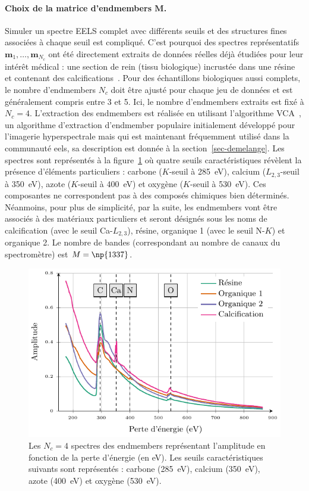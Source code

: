 \paragraph{Choix de la matrice d'endmembers $\mathbf{M}$.} Simuler un spectre EELS complet avec différents seuils et des structures fines associées à chaque seuil est compliqué. C'est pourquoi des spectres représentatifs $\mathbf{m}_1,\dots,\mathbf{m}_{N_c}$ ont été directement extraits de données réelles déjà étudiées pour leur intérêt médical : une section de rein (tissu biologique) incrustée dans une résine et contenant des calcifications~\cite{gay2020nanoscale}. Pour des échantillons biologiques aussi complets, le nombre d'endmembers $N_c$ doit être ajusté pour chaque jeu de données et est généralement compris entre 3 et 5. Ici, le nombre d'endmembers extraits est fixé à $N_c=4$. L'extraction des endmembers est réalisée en utilisant l'algorithme VCA~\cite{nascimento2005vertex}, un algorithme d'extraction d'endmember populaire initialement développé pour l'imagerie hyperspectrale mais qui est maintenant fréquemment utilisé dans la communauté \gls{eels}, sa description est donnée à la section~\ref{sec-demelange}.
%
Les spectres sont représentés à la figure~\ref{fig-spectres-synth} où quatre seuils caractéristiques révèlent la présence d'éléments particuliers : carbone ($K$-seuil à 285~eV), calcium ($L_{2,3}$-seuil à 350~eV), azote ($K$-seuil à 400~eV) et oxygène ($K$-seuil à 530~eV). Ces composantes ne correspondent pas à des composés chimiques bien déterminés. Néanmoins, pour plus de simplicité, par la suite, les endmembers vont être associés à des matériaux particuliers et seront désignés sous les noms de calcification (avec le seuil Ca-$L_{2, 3}$), résine, organique 1 (avec le seuil N-$K$) et organique 2. Le nombre de bandes (correspondant au nombre de canaux du spectromètre) est $M=\np{1337}$.


\begin{figure}[h!]
    \centering
    \includegraphics{img/chapitre3/figure4/endmember_spectra.pdf}
    \caption{Les $N_c=4$ spectres des endmembers représentant l'amplitude en fonction de la perte d'énergie (en eV). Les seuils caractéristiques suivants sont représentés : carbone (285~eV), calcium (350~eV), azote (400~eV) et oxygène (530~eV).
        \protect\label{fig-spectres-synth}}
\end{figure}


